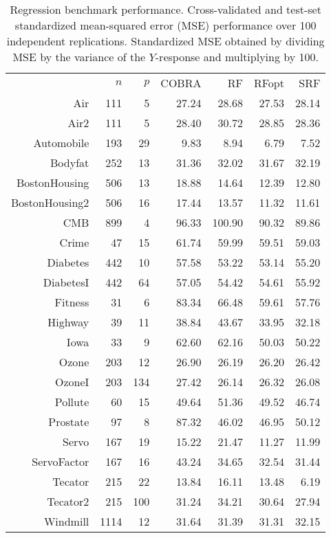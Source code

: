 \documentclass{bmcart}
\def\RFopt{RFopt}
\begin{document}
\begin{backmatter}
\begin{table}[pht]
\caption{Regression benchmark performance.
  Cross-validated
    and test-set standardized mean-squared error (MSE) performance
    over 100 independent replications.  Standardized MSE obtained by
    dividing MSE by the variance of the $Y$-response and multiplying by
    100.}
\centering
\begin{tabular}{rrrrrrr}
  \cline{2-7}
&$n$ & $p$ & COBRA & RF & \RFopt & SRF \\ 
  \cline{2-7}
Air & 111 & 5 & 27.24 & 28.68 & 27.53 & 28.14 \\ 
  Air2 & 111 & 5 & 28.40 & 30.72 & 28.85 & 28.36 \\ 
  Automobile & 193 & 29 & 9.83 & 8.94 & 6.79 & 7.52 \\ 
  Bodyfat & 252 & 13 & 31.36 & 32.02 & 31.67 & 32.19 \\ 
  BostonHousing & 506 & 13 & 18.88 & 14.64 & 12.39 & 12.80 \\ 
  BostonHousing2 & 506 & 16 & 17.44 & 13.57 & 11.32 & 11.61 \\ 
  CMB & 899 & 4 & 96.33 & 100.90 & 90.32 & 89.86 \\ 
  Crime & 47 & 15 & 61.74 & 59.99 & 59.51 & 59.03 \\ 
  Diabetes & 442 & 10 & 57.58 & 53.22 & 53.14 & 55.20 \\ 
  DiabetesI & 442 & 64 & 57.05 & 54.42 & 54.61 & 55.92 \\ 
  Fitness & 31 & 6 & 83.34 & 66.48 & 59.61 & 57.76 \\ 
  Highway & 39 & 11 & 38.84 & 43.67 & 33.95 & 32.18 \\ 
  Iowa & 33 & 9 & 62.60 & 62.16 & 50.03 & 50.22 \\ 
  Ozone & 203 & 12 & 26.90 & 26.19 & 26.20 & 26.42 \\ 
  OzoneI & 203 & 134 & 27.42 & 26.14 & 26.32 & 26.08 \\ 
  Pollute & 60 & 15 & 49.64 & 51.36 & 49.52 & 46.74 \\ 
  Prostate & 97 & 8 & 87.32 & 46.02 & 46.95 & 50.12 \\ 
  Servo & 167 & 19 & 15.22 & 21.47 & 11.27 & 11.99 \\ 
  ServoFactor & 167 & 16 & 43.24 & 34.65 & 32.54 & 31.44 \\ 
  Tecator & 215 & 22 & 13.84 & 16.11 & 13.48 & 6.19 \\ 
  Tecator2 & 215 & 100 & 31.24 & 34.21 & 30.64 & 27.94 \\ 
  Windmill & 1114 & 12 & 31.64 & 31.39 & 31.31 & 32.15 \\ 

\end{tabular}
\end{table}
\end{backmatter}
\end{document}
